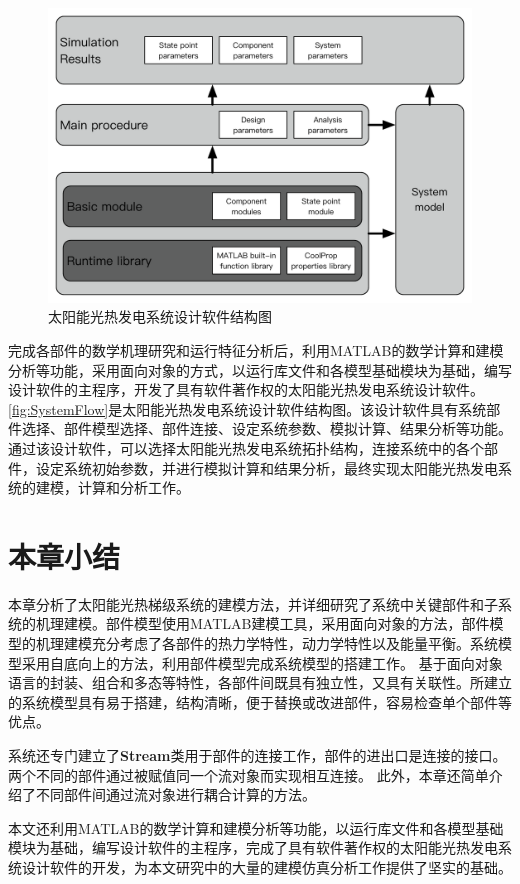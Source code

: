 \begin{figure}[htbp]
	\centering
	\includegraphics[width = 0.8\columnwidth]{fig/SystemFlow}
	\caption{太阳能光热发电系统设计软件结构图}
	\label{fig:SystemFlow}
\end{figure}

完成各部件的数学机理研究和运行特征分析后，利用MATLAB的数学计算和建模分析等功能，采用面向对象的方式，以运行库文件和各模型基础模块为基础，编写设计软件的主程序，开发了具有软件著作权的太阳能光热发电系统设计软件。\autoref{fig:SystemFlow}是太阳能光热发电系统设计软件结构图。该设计软件具有系统部件选择、部件模型选择、部件连接、设定系统参数、模拟计算、结果分析等功能。
通过该设计软件，可以选择太阳能光热发电系统拓扑结构，连接系统中的各个部件，设定系统初始参数，并进行模拟计算和结果分析，最终实现太阳能光热发电系统的建模，计算和分析工作。

\section{本章小结}

本章分析了太阳能光热梯级系统的建模方法，并详细研究了系统中关键部件和子系统的机理建模。部件模型使用MATLAB建模工具，采用面向对象的方法，部件模型的机理建模充分考虑了各部件的热力学特性，动力学特性以及能量平衡。系统模型采用自底向上的方法，利用部件模型完成系统模型的搭建工作。
基于面向对象语言的封装、组合和多态等特性，各部件间既具有独立性，又具有关联性。所建立的系统模型具有易于搭建，结构清晰，便于替换或改进部件，容易检查单个部件等优点。

系统还专门建立了\textbf{Stream}类用于部件的连接工作，部件的进出口是连接的接口。两个不同的部件通过被赋值同一个流对象而实现相互连接。
此外，本章还简单介绍了不同部件间通过流对象进行耦合计算的方法。

本文还利用MATLAB的数学计算和建模分析等功能，以运行库文件和各模型基础模块为基础，编写设计软件的主程序，完成了具有软件著作权的太阳能光热发电系统设计软件的开发，为本文研究中的大量的建模仿真分析工作提供了坚实的基础。

